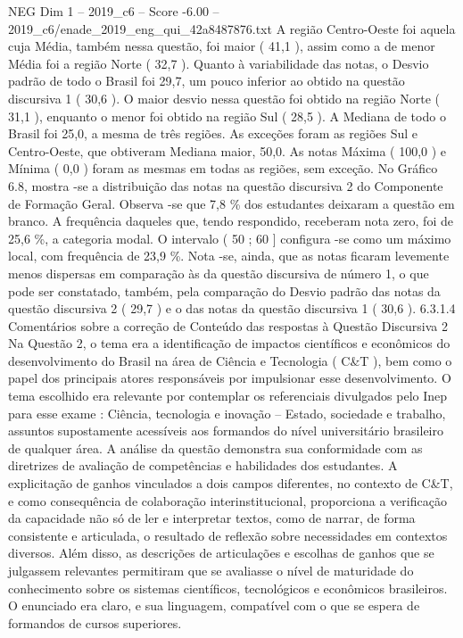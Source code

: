\begin{textsample}{NEG Dim 1 – 2019\_c6 – Score -6.00 – 2019\_c6/enade\_2019\_eng\_qui\_42a8487876.txt}
A região Centro-Oeste foi aquela cuja Média, também nessa questão, foi maior ( 41,1 ), assim como a de menor Média foi a região Norte ( 32,7 ).
Quanto à variabilidade das notas, o Desvio padrão de todo o Brasil foi 29,7, um pouco inferior ao obtido na questão discursiva 1 ( 30,6 ).
O maior desvio nessa questão foi obtido na região Norte ( 31,1 ), enquanto o menor foi obtido na região Sul ( 28,5 ).
A Mediana de todo o Brasil foi 25,0, a mesma de três regiões.
As exceções foram as regiões Sul e Centro-Oeste, que obtiveram Mediana maior, 50,0.
As notas Máxima ( 100,0 ) e Mínima ( 0,0 ) foram as mesmas em todas as regiões, sem exceção.
No Gráfico 6.8, mostra -se a distribuição das notas na questão discursiva 2 do Componente de Formação Geral.
Observa -se que 7,8 \% dos estudantes deixaram a questão em branco.
A frequência daqueles que, tendo respondido, receberam nota zero, foi de 25,6 \%, a categoria modal.
O intervalo ( 50 ; 60 ] configura -se como um máximo local, com frequência de 23,9 \%.
Nota -se, ainda, que as notas ficaram levemente menos dispersas em comparação às da questão discursiva de número 1, o que pode ser constatado, também, pela comparação do Desvio padrão das notas da questão discursiva 2 ( 29,7 ) e o das notas da questão discursiva 1 ( 30,6 ). 6.3.1.4 Comentários sobre a correção de Conteúdo das respostas à Questão Discursiva 2 Na Questão 2, o tema era a identificação de impactos científicos e econômicos do desenvolvimento do Brasil na área de Ciência e Tecnologia ( C\&T ), bem como o papel dos principais atores responsáveis por impulsionar esse desenvolvimento.
O tema escolhido era relevante por contemplar os referenciais divulgados pelo Inep para esse exame : Ciência, tecnologia e inovação – Estado, sociedade e trabalho, assuntos supostamente acessíveis aos formandos do nível universitário brasileiro de qualquer área.
A análise da questão demonstra sua conformidade com as diretrizes de avaliação de competências e habilidades dos estudantes.
A explicitação de ganhos vinculados a dois campos diferentes, no contexto de C\&T, e como consequência de colaboração interinstitucional, proporciona a verificação da capacidade não só de ler e interpretar textos, como de narrar, de forma consistente e articulada, o resultado de reflexão sobre necessidades em contextos diversos.
Além disso, as descrições de articulações e escolhas de ganhos que se julgassem relevantes permitiram que se avaliasse o nível de maturidade do conhecimento sobre os sistemas científicos, tecnológicos e econômicos brasileiros.
O enunciado era claro, e sua linguagem, compatível com o que se espera de formandos de cursos superiores.

\end{textsample}

